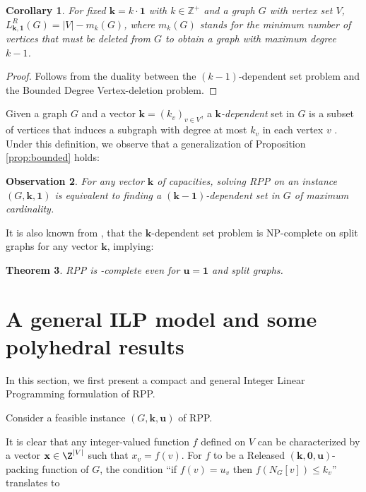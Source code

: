 \documentclass[preprint,12pt]{article}
\renewcommand{\leq}{\leqslant}
\newtheorem{theorem}{Theorem}[section]
\newtheorem{corollary}[theorem]{Corollary}
\newtheorem{observation}[theorem]{Observation}
\theoremstyle{definition}
\begin{document}
\begin{corollary}\label{cor:delete} For  fixed  $\mathbf{k}=k\cdot \mathbf{1}$ with $ k \in \mathbb{Z}^+$ and a graph $G$ with vertex set $V$, $L^R_{\mathbf{k}, \mathbf{1}}(G)=|V|-m_k(G)$, where $m_k(G)$ stands for the minimum number of vertices that must be deleted from $G$ to obtain a graph with maximum degree $k-1$.
 \end{corollary}

 \begin{proof}
     Follows from the duality between the $(k-1)$-dependent set problem and the Bounded Degree Vertex-deletion problem.
 \end{proof}

 
    Given a graph $G$ and a vector $\mathbf{k}=(k_v)_{v\in V}$, a \emph{$\mathbf{k}$-dependent} set in $G$  is  a subset of vertices that induces a subgraph  with degree at most $k_v$ in each vertex $v$ \cite{Dessmark1993}.
Under this definition, we observe that a generalization of  Proposition  \ref{prop:bounded} holds: 

\begin{observation}\label{obs:general} 
For any vector $\mathbf{k}$ of capacities, 
    solving RPP on an instance $(G, \mathbf{k}, \mathbf{1})$ is equivalent to finding a $(
    \mathbf{k}-\mathbf{1})$-dependent set in $G$  of maximum cardinality.
\end{observation}

It is also known from \cite{Dessmark1993}, that the  $
    \mathbf{k}$-dependent set problem is NP-complete on split graphs for any vector  $
    \mathbf{k}$, implying:
    
 \begin{theorem}
 RPP is -complete even for $\mathbf{u}=\mathbf{1}$ and  split  graphs.
 \end{theorem}   
    
\section{A general ILP model and some polyhedral results}\label{sec:ilpmodel}



In this section,  we first present a compact and general  Integer Linear Programming formulation of RPP. 


Consider a feasible instance $(G, \mathbf{k}, \mathbf{u})$ of RPP. 

It is clear that any  integer-valued function $f$ defined on $V$ can be characterized by a  vector $\mathbf{x}\in \Z^{|V|}$
such that $x_v = f(v)$.
For $f$ to be a Released $(\mathbf{k}, \mathbf{0}, \mathbf{u})$-packing function of $G$, the condition
``if $f(v) =u_v$ then  $f(N_G[v])\leq k_v$'' translates to 
\end{document}
